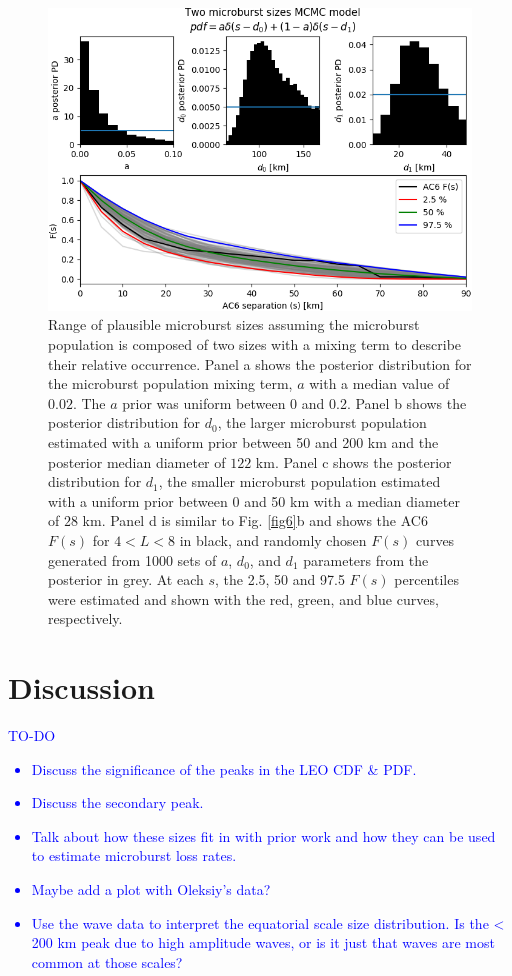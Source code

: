 \documentclass[draft]{agujournal2019}
\begin{document}
\begin{figure}
\includegraphics[width=\textwidth]{fig7.png}
\caption{Range of plausible microburst sizes assuming the microburst population is composed of two sizes with a mixing term to describe their relative occurrence. Panel a shows the posterior distribution for the microburst population mixing term, $a$ with a median value of $0.02$. The $a$ prior was uniform between 0 and 0.2. Panel b shows the posterior distribution for $d_0$, the larger microburst population estimated with a uniform prior between 50 and 200 km and the posterior median diameter of $122$ km. Panel c shows the posterior distribution for $d_1$, the smaller microburst population estimated with a uniform prior between 0 and 50 km  with a median diameter of $28$ km. Panel d is similar to Fig. \ref{fig6}b and shows the AC6 $F(s)$ for $4 < L < 8$ in black, and randomly chosen $F(s)$ curves generated from 1000 sets of $a$, $d_0$, and $d_1$ parameters from the posterior in grey. At each $s$, the 2.5, 50 and 97.5 $F(s)$ percentiles were estimated and shown with the red, green, and blue curves, respectively.
} 
\label{fig7}
\end{figure}

\section{Discussion}
\textcolor{blue}{
TO-DO
\begin{itemize}
\item Discuss the significance of the peaks in the LEO CDF \& PDF.
\item Discuss the secondary peak.
\item Talk about how these sizes fit in with prior work and how they can be used to estimate microburst loss rates.
\item Maybe add a plot with Oleksiy's data?
\item Use the wave data to interpret the equatorial scale size distribution. Is the < 200 km peak due to high amplitude waves, or is it just that waves are most common at those scales?
\end{itemize}
}
\end{document}
